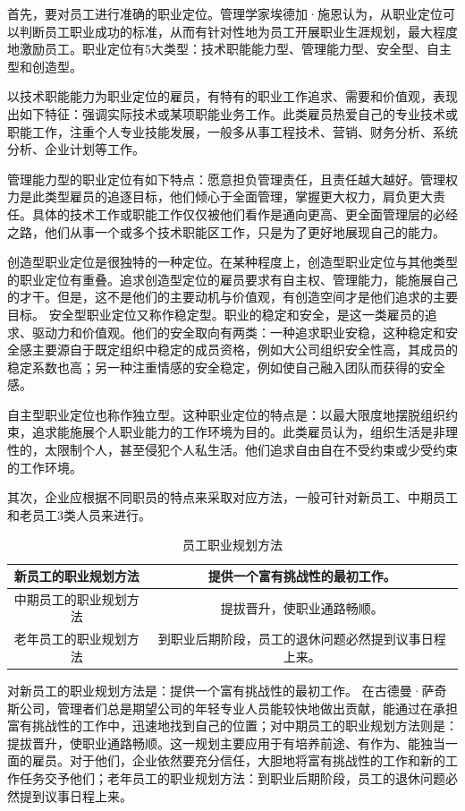 \documentclass[10pt,letterpaper]{article}
\begin{document}
首先，要对员工进行准确的职业定位。管理学家埃德加·施恩认为，从职业定位可以判断员工职业成功的标准，从而有针对性地为员工开展职业生涯规划，最大程度地激励员工。职业定位有5大类型：技术职能能力型、管理能力型、安全型、自主型和创造型。

以技术职能能力为职业定位的雇员，有特有的职业工作追求、需要和价值观，表现出如下特征：强调实际技术或某项职能业务工作。此类雇员热爱自己的专业技术或职能工作，注重个人专业技能发展，一般多从事工程技术、营销、财务分析、系统分析、企业计划等工作。

管理能力型的职业定位有如下特点：愿意担负管理责任，且责任越大越好。管理权力是此类型雇员的追逐目标，他们倾心于全面管理，掌握更大权力，肩负更大责任。具体的技术工作或职能工作仅仅被他们看作是通向更高、更全面管理层的必经之路，他们从事一个或多个技术职能区工作，只是为了更好地展现自己的能力。

创造型职业定位是很独特的一种定位。在某种程度上，创造型职业定位与其他类型的职业定位有重叠。追求创造型定位的雇员要求有自主权、管理能力，能施展自己的才干。但是，这不是他们的主要动机与价值观，有创造空间才是他们追求的主要目标。
安全型职业定位又称作稳定型。职业的稳定和安全，是这一类雇员的追求、驱动力和价值观。他们的安全取向有两类：一种追求职业安稳，这种稳定和安全感主要源自于既定组织中稳定的成员资格，例如大公司组织安全性高，其成员的稳定系数也高；另一种注重情感的安全稳定，例如使自己融入团队而获得的安全感。

自主型职业定位也称作独立型。这种职业定位的特点是：以最大限度地摆脱组织约束，追求能施展个人职业能力的工作环境为目的。此类雇员认为，组织生活是非理性的，太限制个人，甚至侵犯个人私生活。他们追求自由自在不受约束或少受约束的工作环境。

其次，企业应根据不同职员的特点来采取对应方法，一般可针对新员工、中期员工和老员工3类人员来进行。

\begin{table}[!htbp]
\centering
\begin{tabular}{|c|c|}
\hline
新员工的职业规划方法 & 提供一个富有挑战性的最初工作。 \\
\hline
中期员工的职业规划方法 & 提拔晋升，使职业通路畅顺。 \\
\hline
老年员工的职业规划方法 & 到职业后期阶段，员工的退休问题必然提到议事日程上来。 \\
\hline
\end{tabular}
\caption{员工职业规划方法}\label{tab:aStrangeTable}
\end{table}

对新员工的职业规划方法是：提供一个富有挑战性的最初工作。 在古德曼·萨奇斯公司，管理者们总是期望公司的年轻专业人员能较快地做出贡献，能通过在承担富有挑战性的工作中，迅速地找到自己的位置；对中期员工的职业规划方法则是：提拔晋升，使职业通路畅顺。这一规划主要应用于有培养前途、有作为、能独当一面的雇员。对于他们，企业依然要充分信任，大胆地将富有挑战性的工作和新的工作任务交予他们；老年员工的职业规划方法：到职业后期阶段，员工的退休问题必然提到议事日程上来。
\end{document}
